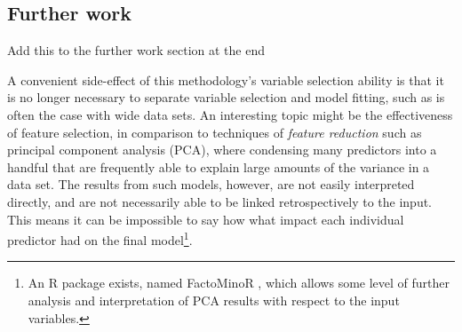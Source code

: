 \documentclass{article}
\begin{document}
\subsection{Further work}
\label{sec-1-4}

Add this to the further work section at the end

A convenient side-effect of this methodology's variable selection ability is that it is no longer necessary to separate variable selection and model fitting, such as is often the case with wide data sets. An interesting topic might be the effectiveness of feature selection, in comparison to techniques of \emph{feature reduction} such as principal component analysis (PCA), where condensing many predictors into a handful that are frequently able to explain large amounts of the variance in a data set. The results from such models, however, are not easily interpreted directly, and are not necessarily able to be linked retrospectively to the input. This means it can be impossible to say how what impact each individual predictor had on the final model\footnote{An R package exists, named FactoMinoR \cite{le2008factominer}, which allows some level of further analysis and interpretation of PCA results with respect to the input variables.}.
\end{document}
